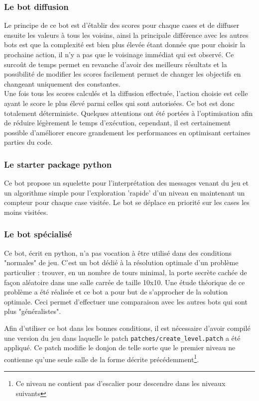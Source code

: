 \documentclass[a4paper,12pt]{article}
\begin{document}
\subsubsection{Le bot diffusion}
Le principe de ce bot est d'établir des scores pour chaque cases et de diffuser
ensuite les valeurs à tous les voisins, ainsi la principale différence avec les
autres bots est que la complexité est bien plus élevée étant donnée que pour
choisir la prochaine action, il n'y a pas que le voisinage immédiat qui est
observé. Ce surcoût de temps permet en revanche d'avoir des meilleurs résultats
et la possibilité de modifier les scores facilement permet de changer les
objectifs en changeant uniquement des constantes.
\\
Une fois tous les scores calculés et la diffusion effectuée, l'action choisie
est celle ayant le score le plus élevé parmi celles qui sont autorisées. Ce bot
est donc totalement déterministe. Quelques attentions ont été portées à
l'optimisation afin de réduire légèrement le temps d'exécution, cependant, il
est certainement possible d'améliorer encore grandement les performances en
optimisant certaines parties du code.

\subsubsection{Le starter package python}

Ce bot propose un squelette pour l'interprétation des messages venant du jeu
et un algorithme simple pour l'exploration 'rapide' d'un niveau en maintenant
un compteur pour chaque case visitée. Le bot se déplace en priorité sur les
cases les moins visitées.

\subsubsection{Le bot spécialisé}

Ce bot, écrit en python, n'a pas vocation à être utilisé dans des conditions
"normales" de jeu. C'est un bot dédié à la résolution optimale d'un problème
particulier : trouver, en un nombre de tours minimal, la porte secrète cachée
de façon aléatoire dans une salle carrée de taille 10x10. Une étude théorique
de ce problème a été réalisée et ce bot a pour but de s'approcher de la
solution optimale. Ceci permet d'effectuer une comparaison avec les autres
bots qui sont plus "généralistes".

Afin d'utiliser ce bot dans les bonnes conditions, il est nécessaire d'avoir
compilé une version du jeu dans laquelle le patch
{\verb|patches/create_level.patch|} a été appliqué. Ce patch modifie le donjon
de telle sorte que le premier niveau ne contienne qu'une seule salle de la
forme décrite précédemment\footnote{Ce niveau ne contient pas d'escalier pour
descendre dans les niveaux suivants}.
\end{document}
